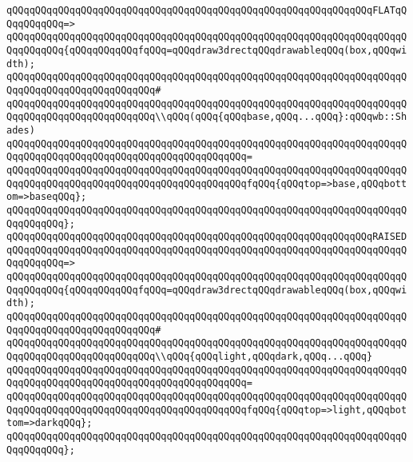 \verb|qQQqqQQqqQQqqQQqqQQqqQQqqQQqqQQqqQQqqQQqqQQqqQQqqQQqqQQqqQQqqQQqFLATqQQqqQQqqQQq=>|\newline
\verb|qQQqqQQqqQQqqQQqqQQqqQQqqQQqqQQqqQQqqQQqqQQqqQQqqQQqqQQqqQQqqQQqqQQqqQQqqQQqqQQq{qQQqqQQqqQQqfqQQq=qQQqdraw3drectqQQqdrawableqQQq(box,qQQqwidth);|\newline
\verb|qQQqqQQqqQQqqQQqqQQqqQQqqQQqqQQqqQQqqQQqqQQqqQQqqQQqqQQqqQQqqQQqqQQqqQQqqQQqqQQqqQQqqQQqqQQqqQQq#|\newline
\verb|qQQqqQQqqQQqqQQqqQQqqQQqqQQqqQQqqQQqqQQqqQQqqQQqqQQqqQQqqQQqqQQqqQQqqQQqqQQqqQQqqQQqqQQqqQQqqQQq\\qQQq(qQQq{qQQqbase,qQQq...qQQq}:qQQqwb::Shades)|\newline
\verb|qQQqqQQqqQQqqQQqqQQqqQQqqQQqqQQqqQQqqQQqqQQqqQQqqQQqqQQqqQQqqQQqqQQqqQQqqQQqqQQqqQQqqQQqqQQqqQQqqQQqqQQqqQQqqQQq=|\newline
\verb|qQQqqQQqqQQqqQQqqQQqqQQqqQQqqQQqqQQqqQQqqQQqqQQqqQQqqQQqqQQqqQQqqQQqqQQqqQQqqQQqqQQqqQQqqQQqqQQqqQQqqQQqqQQqqQQqfqQQq{qQQqtop=>base,qQQqbottom=>baseqQQq};|\newline
\verb|qQQqqQQqqQQqqQQqqQQqqQQqqQQqqQQqqQQqqQQqqQQqqQQqqQQqqQQqqQQqqQQqqQQqqQQqqQQqqQQq};|\newline
\newline
\verb|qQQqqQQqqQQqqQQqqQQqqQQqqQQqqQQqqQQqqQQqqQQqqQQqqQQqqQQqqQQqqQQqRAISED|\newline
\verb|qQQqqQQqqQQqqQQqqQQqqQQqqQQqqQQqqQQqqQQqqQQqqQQqqQQqqQQqqQQqqQQqqQQqqQQqqQQqqQQq=>|\newline
\verb|qQQqqQQqqQQqqQQqqQQqqQQqqQQqqQQqqQQqqQQqqQQqqQQqqQQqqQQqqQQqqQQqqQQqqQQqqQQqqQQq{qQQqqQQqqQQqfqQQq=qQQqdraw3drectqQQqdrawableqQQq(box,qQQqwidth);|\newline
\verb|qQQqqQQqqQQqqQQqqQQqqQQqqQQqqQQqqQQqqQQqqQQqqQQqqQQqqQQqqQQqqQQqqQQqqQQqqQQqqQQqqQQqqQQqqQQqqQQq#|\newline
\verb|qQQqqQQqqQQqqQQqqQQqqQQqqQQqqQQqqQQqqQQqqQQqqQQqqQQqqQQqqQQqqQQqqQQqqQQqqQQqqQQqqQQqqQQqqQQqqQQq\\qQQq{qQQqlight,qQQqdark,qQQq...qQQq}|\newline
\verb|qQQqqQQqqQQqqQQqqQQqqQQqqQQqqQQqqQQqqQQqqQQqqQQqqQQqqQQqqQQqqQQqqQQqqQQqqQQqqQQqqQQqqQQqqQQqqQQqqQQqqQQqqQQqqQQq=|\newline
\verb|qQQqqQQqqQQqqQQqqQQqqQQqqQQqqQQqqQQqqQQqqQQqqQQqqQQqqQQqqQQqqQQqqQQqqQQqqQQqqQQqqQQqqQQqqQQqqQQqqQQqqQQqqQQqqQQqfqQQq{qQQqtop=>light,qQQqbottom=>darkqQQq};|\newline
\verb|qQQqqQQqqQQqqQQqqQQqqQQqqQQqqQQqqQQqqQQqqQQqqQQqqQQqqQQqqQQqqQQqqQQqqQQqqQQqqQQq};|\newline
